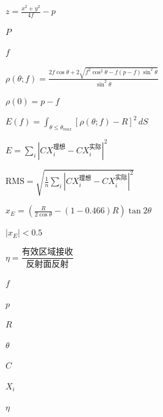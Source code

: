 
$z=\frac{x^2+y^2}{4f}-p$

$P$

$f$

$\rho(\theta;f)=\frac{2f\cos\theta+2\sqrt{f^2\cos^2\theta-f(p-f)\sin^2\theta}}{\sin^2\theta}$

$\rho(0)=p-f$

$E(f)=\int_{\theta\le\theta_{max}}[\rho(\theta;f)-R]^2\,dS$

$E=\sum_i|C X_i^{理想}-C X_i^{实际}|^2$

$\mathrm{RMS}=\sqrt{\frac1n\sum_i|C X_i^{理想}-C X_i^{实际}|^2}$

$x_E=(\tfrac{R}{2\cos\theta}-(1-0.466)R)\tan 2\theta$

$|x_E|<0.5$

$\eta=\dfrac{\text{有效区域接收}}{\text{反射面反射}}$

$f$

$p$

$R$

$\theta$

$C$

$X_i$

$\eta$

